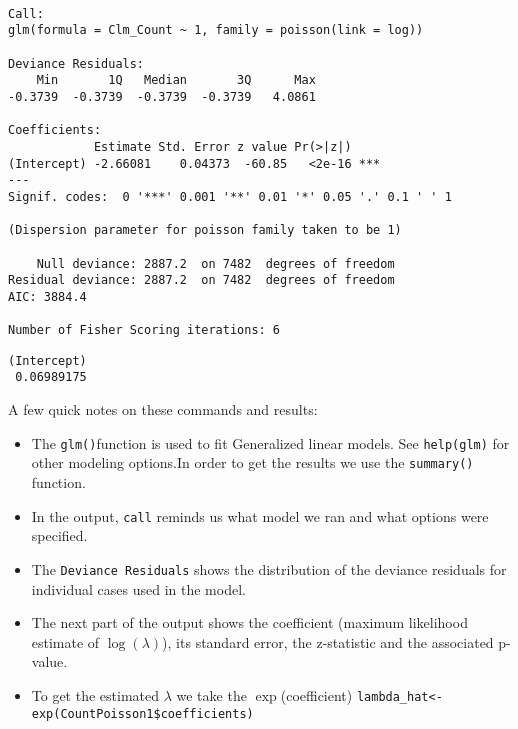 \documentclass[]{book}
\newenvironment{Shaded}{\begin{snugshade}}{\end{snugshade}}
\newcommand{\KeywordTok}[1]{\textcolor[rgb]{0.13,0.29,0.53}{\textbf{#1}}}
\newcommand{\OperatorTok}[1]{\textcolor[rgb]{0.81,0.36,0.00}{\textbf{#1}}}
\newcommand{\NormalTok}[1]{#1}
\providecommand{\tightlist}{%
  \setlength{\itemsep}{0pt}\setlength{\parskip}{0pt}}
\theoremstyle{definition}
\theoremstyle{definition}
\theoremstyle{definition}
\theoremstyle{remark}
\begin{document}
\begin{verbatim}

Call:
glm(formula = Clm_Count ~ 1, family = poisson(link = log))

Deviance Residuals: 
    Min       1Q   Median       3Q      Max  
-0.3739  -0.3739  -0.3739  -0.3739   4.0861  

Coefficients:
            Estimate Std. Error z value Pr(>|z|)    
(Intercept) -2.66081    0.04373  -60.85   <2e-16 ***
---
Signif. codes:  0 '***' 0.001 '**' 0.01 '*' 0.05 '.' 0.1 ' ' 1

(Dispersion parameter for poisson family taken to be 1)

    Null deviance: 2887.2  on 7482  degrees of freedom
Residual deviance: 2887.2  on 7482  degrees of freedom
AIC: 3884.4

Number of Fisher Scoring iterations: 6
\end{verbatim}

\begin{Shaded}
\end{Shaded}

\begin{verbatim}
(Intercept) 
 0.06989175 
\end{verbatim}

A few quick notes on these commands and results:

\begin{itemize}
\tightlist
\item
  The \texttt{glm()}function is used to fit Generalized linear models.
  See \texttt{help(glm)} for other modeling options.In order to get the
  results we use the \texttt{summary()} function.
\item
  In the output, \texttt{call} reminds us what model we ran and what
  options were specified.
\item
  The \texttt{Deviance\ Residuals} shows the distribution of the
  deviance residuals for individual cases used in the model.
\item
  The next part of the output shows the coefficient (maximum likelihood
  estimate of \(\log(\lambda)\)), its standard error, the z-statistic
  and the associated p-value.
\item
  To get the estimated \(\lambda\) we take the \(\exp\)(coefficient)
  \texttt{lambda\_hat\textless{}-exp(CountPoisson1\$coefficients)}
\end{itemize}
\end{document}
